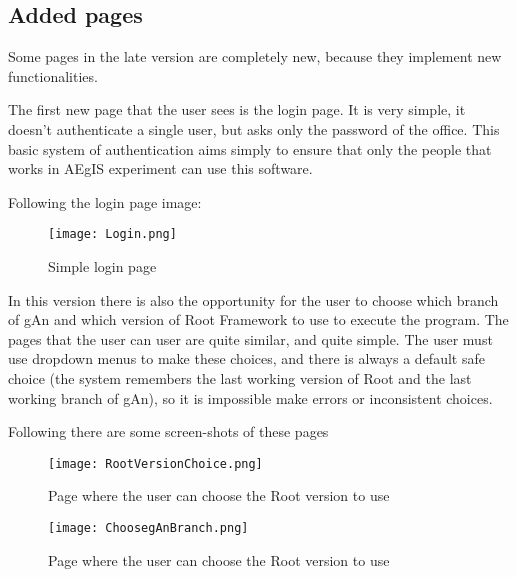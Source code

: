 \subsection{Added pages}

Some pages in the late version are completely new, because they implement new functionalities.

The first new page that the user sees is the login page. It is very simple, it doesn't authenticate a single user, but asks only the password of the office. This basic system of authentication aims simply to ensure that only the people that works in AEgIS experiment can use this software.

Following the login page image:

\begin{figure}[H]
\centering
\texttt{[image: Login.png]} 
\caption{Simple login page}
\end{figure}

In this version there is also the opportunity for the user to choose which branch of gAn and which version of Root Framework to use to execute the program. The pages that the user can user are quite similar, and quite simple. The user must use dropdown menus to make these choices, and there is always a default safe choice (the system remembers the last working version of Root and the last working branch of gAn), so it is impossible make errors or inconsistent choices. 

Following there are some screen-shots of these pages

\begin{figure}[H]
\centering
\texttt{[image: RootVersionChoice.png]} 
\caption{Page where the user can choose the Root version to use}
\end{figure}
 
 
\begin{figure}[H]
\centering
\texttt{[image: ChoosegAnBranch.png]} 
\caption{Page where the user can choose the Root version to use}
\end{figure}
